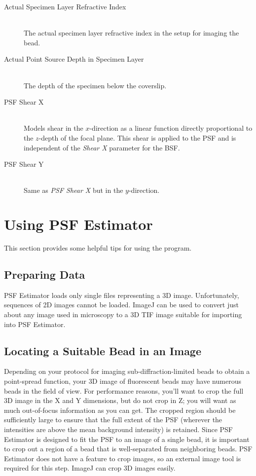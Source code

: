 \documentclass[11pt,titlepage,twoside]{article}
\begin{document}
\begin{description}
  \item[Actual Specimen Layer Refractive Index] \hfill \\
   The actual specimen layer refractive index in the setup for imaging the bead.
  
  \item[Actual Point Source Depth in Specimen Layer] \hfill \\
   The depth of the specimen below the coverslip.

  \item[PSF Shear X] \hfill \\
   Models shear in the $x$-direction as a linear function directly proportional to the $z$-depth of the focal plane. This shear is applied to the PSF and is independent of the \emph{Shear X} parameter for the BSF.

  \item[PSF Shear Y] \hfill \\
   Same as \emph{PSF Shear X} but in the $y$-direction.
 
\end{description}

\section{Using PSF Estimator}

This section provides some helpful tips for using the program.

\subsection{Preparing Data}

PSF Estimator loads only single files representing a 3D image. Unfortunately, sequences of 2D images cannot be loaded. ImageJ can be used to convert just about any image used in microscopy to a 3D TIF image suitable for importing into PSF Estimator.

\subsection{Locating a Suitable Bead in an Image}

Depending on your protocol for imaging sub-diffraction-limited beads to obtain a point-spread function, your 3D image of fluorescent beads may have numerous beads in the field of view. For performance reasons, you'll want to crop the full 3D image in the X and Y dimensions, but do not crop in Z; you will want as much out-of-focus information as you can get. The cropped region should be sufficiently large to ensure that the full extent of the PSF (wherever the intensities are above the mean background intensity) is retained. Since PSF Estimator is designed to fit the PSF to an image of a single bead, it is important to crop out a region of a bead that is well-separated from neighboring beads. PSF Estimator does not have a feature to crop images, so an external image tool is required for this step. ImageJ can crop 3D images easily.
\end{document}
